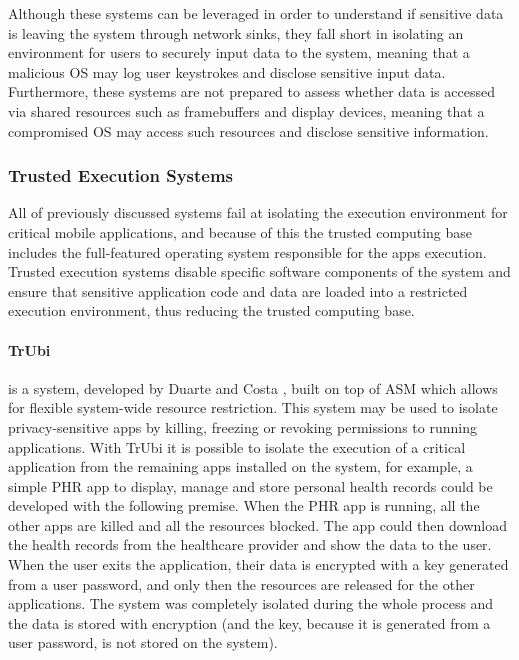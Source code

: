 Although these systems can be leveraged in order to understand if sensitive data is leaving the system through network sinks, they fall short in isolating an environment for users to securely input data to the system, meaning that a malicious OS may log user keystrokes and disclose sensitive input data. Furthermore, these systems are not prepared to assess whether data is accessed via shared resources such as framebuffers and display devices, meaning that a compromised OS may access such resources and disclose sensitive information.

\subsubsection{Trusted Execution Systems}
\label{sec:tee}

All of previously discussed systems fail at isolating the execution environment for critical mobile applications, and because of this the trusted computing base includes the full-featured operating system responsible for the apps execution. Trusted execution systems disable specific software components of the system and ensure that sensitive application code and data are loaded into a restricted execution environment, thus reducing the trusted computing base.

\paragraph{\textbf{TrUbi}} is a system, developed by Duarte \cite{nunoduarte} and Costa \cite{miguelcosta}, built on top of ASM \cite{heuser2014asm} which allows for flexible system-wide resource restriction. This system may be used to isolate privacy-sensitive apps by killing, freezing or revoking permissions to running applications. With TrUbi it is possible to isolate the execution of a critical application from the remaining apps installed on the system, for example, a simple \ac{PHR} app to display, manage and store personal health records could be developed with the following premise. When the \ac{PHR} app is running, all the other apps are killed and all the resources blocked. The app could then download the health records from the healthcare provider and show the data to the user. When the user exits the application, their data is encrypted with a key generated from a user password, and only then the resources are released for the other applications. The system was completely isolated during the whole process and the data is stored with encryption (and the key, because it is generated from a user password, is not stored on the system).

